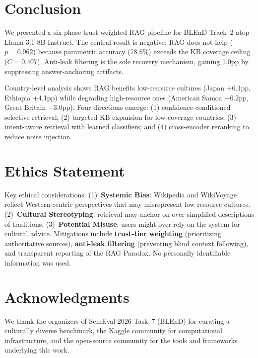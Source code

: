 \documentclass[11pt,a4paper]{article}
\begin{document}
\section{Conclusion}

We presented a six-phase trust-weighted RAG pipeline for BLEnD Track~2 atop Llama-3.1-8B-Instruct. The central result is negative: RAG does not help ($p = 0.962$) because parametric accuracy (78.6\%) exceeds the KB coverage ceiling ($\bar{C} = 0.407$). Anti-leak filtering is the sole recovery mechanism, gaining 1.0pp by suppressing answer-anchoring artifacts.

Country-level analysis shows RAG benefits low-resource cultures (Japan +6.1pp, Ethiopia +4.1pp) while degrading high-resource ones (American Samoa $-6.2$pp, Great Britain $-3.0$pp). Four directions emerge: (1) confidence-conditioned selective retrieval; (2) targeted KB expansion for low-coverage countries; (3) intent-aware retrieval with learned classifiers; and (4) cross-encoder reranking to reduce noise injection.

\section*{Ethics Statement}
Key ethical considerations: (1)~\textbf{Systemic Bias}: Wikipedia and WikiVoyage reflect Western-centric perspectives that may misrepresent low-resource cultures. (2)~\textbf{Cultural Stereotyping}: retrieval may anchor on over-simplified descriptions of traditions. (3)~\textbf{Potential Misuse}: users might over-rely on the system for cultural advice. Mitigations include \textbf{trust-tier weighting} (prioritizing authoritative sources), \textbf{anti-leak filtering} (preventing blind context following), and transparent reporting of the RAG Paradox. No personally identifiable information was used.

\section*{Acknowledgments}
We thank the organizers of SemEval-2026 Task~7 (BLEnD) for curating a culturally diverse benchmark, the Kaggle community for computational infrastructure, and the open-source community for the tools and frameworks underlying this work.


\end{document}
